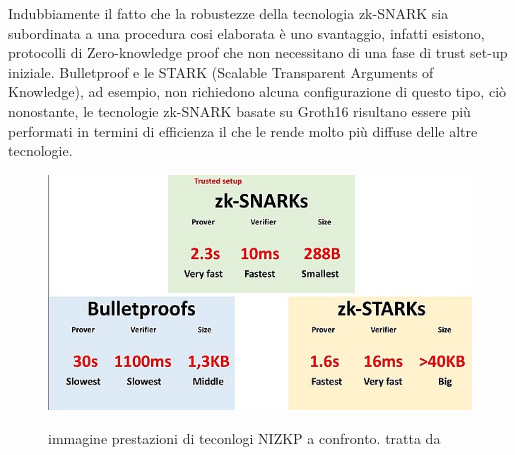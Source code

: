 Indubbiamente il fatto che la robustezze della tecnologia zk-SNARK sia subordinata a una procedura cosi elaborata è uno
svantaggio, infatti esistono, protocolli di Zero-knowledge proof che non necessitano di una fase di trust set-up
iniziale. Bulletproof e le STARK (Scalable Transparent Arguments of Knowledge), ad esempio, non richiedono alcuna
configurazione di questo tipo, ciò nonostante, le tecnologie  zk-SNARK basate su Groth16 risultano essere più performati in termini di
efficienza il che le rende molto più diffuse delle altre tecnologie.
\begin{figure}[H]
    \centering
    \includegraphics[width=13cm]{./chapters/1.state-of-art/images/14.diff_zk.png}
    \label{fig:different_zk}
    \captionsetup{justification=centering}
    \caption{immagine prestazioni di teconlogi NIZKP a confronto. tratta da \cite{non_interactive_zero_knowledge_proof}}
\end{figure}